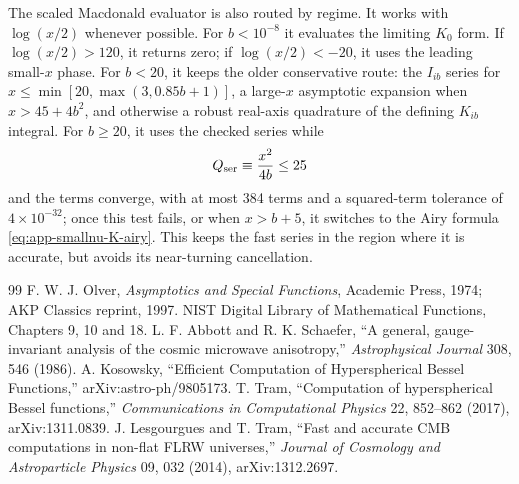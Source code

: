\documentclass[11pt,a4paper]{article}
\begin{document}
The scaled Macdonald evaluator is also routed by regime.  It works with
\(\log(x/2)\) whenever possible.  For \(b<10^{-8}\) it evaluates the limiting
\(K_0\) form.  If \(\log(x/2)>120\), it returns zero; if
\(\log(x/2)<-20\), it uses the leading small-\(x\) phase.  For \(b<20\), it
keeps the older conservative route: the \(I_{ib}\) series for
\(x\le\min[20,\max(3,0.85b+1)]\), a large-\(x\) asymptotic expansion when
\(x>45+4b^2\), and otherwise a robust real-axis quadrature of the defining
\(K_{ib}\) integral.  For \(b\ge20\), it uses the checked series while
\begin{equation}
  Q_{\rm ser}\equiv\frac{x^2}{4b}\le25
\end{equation}
and the terms converge, with at most 384 terms and a squared-term tolerance of
\(4\times10^{-32}\); once this test fails, or when \(x>b+5\), it switches to
the Airy formula \eqref{eq:app-smallnu-K-airy}.  This keeps the fast series in
the region where it is accurate, but avoids its near-turning cancellation.

\begin{thebibliography}{99}
F. W. J. Olver, \emph{Asymptotics and Special Functions}, Academic Press, 1974; AKP Classics reprint, 1997.
NIST Digital Library of Mathematical Functions, Chapters 9, 10 and 18.
L. F. Abbott and R. K. Schaefer, ``A general, gauge-invariant analysis of the cosmic microwave anisotropy,'' \emph{Astrophysical Journal} 308, 546 (1986).
A. Kosowsky, ``Efficient Computation of Hyperspherical Bessel Functions,'' arXiv:astro-ph/9805173.
T. Tram, ``Computation of hyperspherical Bessel functions,'' \emph{Communications in Computational Physics} 22, 852--862 (2017), arXiv:1311.0839.
J. Lesgourgues and T. Tram, ``Fast and accurate CMB computations in non-flat FLRW universes,'' \emph{Journal of Cosmology and Astroparticle Physics} 09, 032 (2014), arXiv:1312.2697.
\end{thebibliography}
\end{document}
